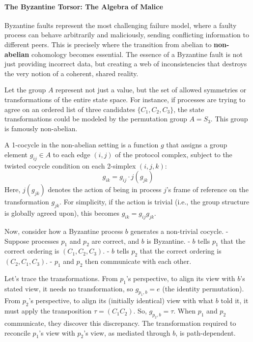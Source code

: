 \documentclass[
]{article}
\begin{document}
\paragraph{The Byzantine Torsor: The Algebra of
Malice}\label{the-byzantine-torsor-the-algebra-of-malice}

Byzantine faults represent the most challenging failure model, where a
faulty process can behave arbitrarily and maliciously, sending
conflicting information to different peers. This is precisely where the
transition from abelian to \textbf{non-abelian} cohomology becomes
essential. The essence of a Byzantine fault is not just providing
incorrect data, but creating a web of inconsistencies that destroys the
very notion of a coherent, shared reality.

Let the group \(A\) represent not just a value, but the set of allowed
symmetries or transformations of the entire state space. For instance,
if processes are trying to agree on an ordered list of three candidates
\(\{C_1, C_2, C_3\}\), the state transformations could be modeled by the
permutation group \(A = S_3\). This group is famously non-abelian.

A 1-cocycle in the non-abelian setting is a function \(g\) that assigns
a group element \(g_{ij} \in A\) to each edge \((i, j)\) of the protocol
complex, subject to the twisted cocycle condition on each 2-simplex
\((i, j, k)\): \[ g_{ik} = g_{ij} \cdot j(g_{jk}) \] Here, \(j(g_{jk})\)
denotes the action of being in process \(j\)'s frame of reference on the
transformation \(g_{jk}\). For simplicity, if the action is trivial
(i.e., the group structure is globally agreed upon), this becomes
\(g_{ik} = g_{ij} g_{jk}\).

Now, consider how a Byzantine process \(b\) generates a non-trivial
cocycle. - Suppose processes \(p_1\) and \(p_2\) are correct, and \(b\)
is Byzantine. - \(b\) tells \(p_1\) that the correct ordering is
\((C_1, C_2, C_3)\). - \(b\) tells \(p_2\) that the correct ordering is
\((C_2, C_1, C_3)\). - \(p_1\) and \(p_2\) then communicate with each
other.

Let's trace the transformations. From \(p_1\)'s perspective, to align
its view with \(b\)'s stated view, it needs no transformation, so
\(g_{p_1, b} = e\) (the identity permutation). From \(p_2\)'s
perspective, to align its (initially identical) view with what \(b\)
told it, it must apply the transposition \(\tau = (C_1 C_2)\). So,
\(g_{p_2, b} = \tau\). When \(p_1\) and \(p_2\) communicate, they
discover this discrepancy. The transformation required to reconcile
\(p_1\)'s view with \(p_2\)'s view, as mediated through \(b\), is
path-dependent.
\end{document}
